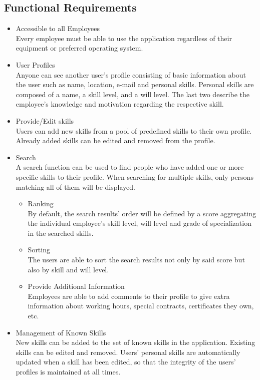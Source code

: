 \subsection{Functional Requirements}
\begin{itemize}
 	\item Accessible to all Employees\\
	Every employee must be able to use the application regardless of their equipment or preferred operating system.
	\item User Profiles \\
	Anyone can see another user’s profile consisting of basic information about the user such as name, location, e-mail and personal skills. Personal skills are composed of a name, a skill level, and a will level. The last two describe the employee's knowledge and motivation regarding the respective skill.
	\item Provide/Edit skills\\
	Users can add new skills from a pool of predefined skills to their own profile. Already added skills can be edited and removed from the profile.
	\item Search\\
	A search function can be used to find people who have added one or more specific skills to their profile. When searching for multiple skills, only persons matching all of them will be displayed.
	\begin{itemize}
		\item Ranking\\
			By default, the search results' order will be defined by a score aggregating the individual employee's skill level, will level and grade of specialization in the searched skills.
		\item Sorting\\
			The users are able to sort the search results not only by said score
			but also by skill and will level.
	\item Provide Additional Information\\
			Employees are able to add comments to their profile to give extra information about working hours, special contracts, certificates they own, etc.
	\end{itemize}
	\item Management of Known Skills\\
	New skills can be added to the set of known skills in the application. Existing skills can be edited and removed. Users' personal skills are automatically updated when a skill has been edited, so that the integrity of the users' profiles is maintained at all times.
\end{itemize}

